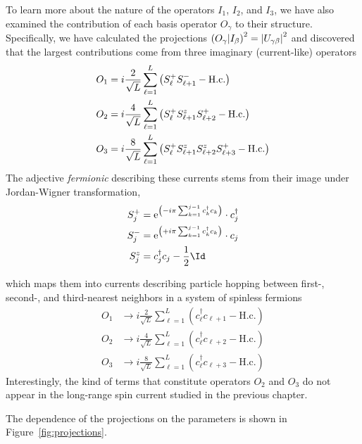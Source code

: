 To learn more about the nature of the operators \(I_1\), \(I_2\), and \(I_3\), we have also
examined the contribution of each basis operator \(O_{\gamma}\) to their structure. Specifically,
we have calculated the projections \(\left(O_{\gamma} \middle| I_{\beta}\right)^2 = \abs{U_{\gamma\beta}}^2\)
and discovered that the largest contributions come from three imaginary (current-like) operators
\begin{align}
  O_1 & = i \frac{2}{\sqrt{L}} \sum_{\ell=1}^L \left(S^{+}_{\ell} S^{-}_{\ell+1} - \textrm{H.c.}\right)               \\
  O_2 & = i \frac{4}{\sqrt{L}} \sum_{\ell=1}^L \left(S^{+}_{\ell} S^{z}_{\ell+1} S^{+}_{\ell+2} - \textrm{H.c.}\right)    \\
  O_3 & = i \frac{8}{\sqrt{L}} \sum_{\ell=1}^L \left(S^{+}_{\ell} S^{z}_{\ell+1} S^{z}_{\ell+2} S^{+}_{\ell+3} - \textrm{H.c.}\right)
  \label{eq:fermionic_currents}
\end{align}
The adjective \textit{fermionic} describing these currents stems from their image under Jordan-Wigner transformation,
\begin{align}
  S_j^{+} & =\mathrm{e}^{\left(-i \pi \sum_{k=1}^{j-1} c_k^{\dagger} c_k\right)} \cdot c_j^{\dagger} \\
  S_j^{-} & =\mathrm{e}^{\left(+i \pi \sum_{k=1}^{j-1} c_k^{\dagger} c_k\right)} \cdot c_j \\
  S_j^z & = c_j^{\dagger} c_j- \frac{1}{2} \Id
\end{align}

which maps them into currents describing particle hopping between first-, second-, and third-nearest neighbors in a system
of spinless fermions
\begin{align}
  O_1 & \to i \frac{2}{\sqrt{L}} \sum_{\ell=1}^L \left(c_{\ell}^{\dagger} c_{\ell+1} - \textrm{H.c.}\right)                  \\
  O_2 & \to i \frac{4}{\sqrt{L}} \sum_{\ell=1}^L \left(c_{\ell}^{\dagger} c_{\ell+2} - \textrm{H.c.}\right)     \\
  O_3 & \to i \frac{8}{\sqrt{L}} \sum_{\ell=1}^L \left(c_{\ell}^{\dagger} c_{\ell+3} - \textrm{H.c.}\right)
  \label{eq:fermionic_currents}
\end{align}
Interestingly, the kind of terms that constitute operators \(O_2\) and \(O_3\) do not appear in the
long-range spin current studied in the previous chapter.  

The dependence of the projections on the parameters is shown in Figure~\ref{fig:projections}.

